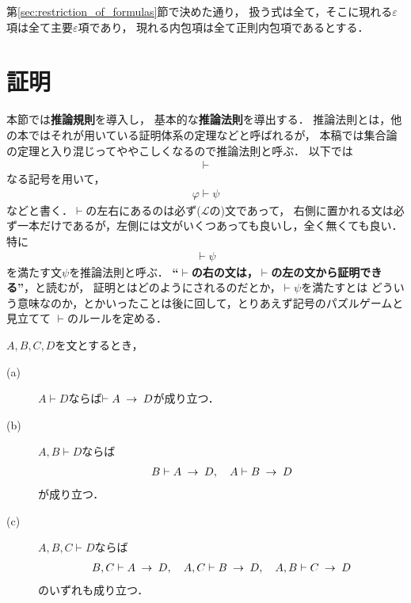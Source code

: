	第\ref{sec:restriction_of_formulas}節で決めた通り，
	扱う式は全て，そこに現れる$\varepsilon$項は全て主要$\varepsilon$項であり，
	現れる内包項は全て正則内包項であるとする．
	
\section{証明}
	本節では{\bf 推論規則}を導入し，
	基本的な{\bf 推論法則}を導出する．
	推論法則とは，他の本ではそれが用いている証明体系の定理などと呼ばれるが，
	本稿では集合論の定理と入り混じってややこしくなるので推論法則と呼ぶ．
	以下では
	\begin{align}
		\vdash
	\end{align}
	なる記号を用いて，
	\begin{align}
		\varphi \vdash \psi
	\end{align}
	などと書く．$\vdash$の左右にあるのは必ず($\mathcal{L}$の)文であって，
	右側に置かれる文は必ず一本だけであるが，左側には文がいくつあっても良いし，全く無くても良い．
	特に
	\begin{align}
		\vdash \psi
	\end{align}
	を満たす文$\psi$を推論法則と呼ぶ．
	{\bf ``$\vdash$の右の文は，$\vdash$の左の文から証明できる''}，と読むが，
	証明とはどのようにされるのだとか，$\vdash \psi$を満たすとは
	どういう意味なのか，とかいったことは後に回して，とりあえず記号のパズルゲームと見立てて
	$\vdash$のルールを定める．
	
	\begin{screen}
		\begin{logicalrule}[演繹規則]\label{logicalrule:deduction_rule}
			$A,B,C,D$を文とするとき，
			\begin{description}
				\item[(a)] $A \vdash D$ならば$\vdash A \hspace{0.25em}\rightarrow\hspace{0.25em} D$が成り立つ．
				\item[(b)] $A,B \vdash D$ならば
					\begin{align}
						B \vdash A \hspace{0.25em}\rightarrow\hspace{0.25em} D,\quad
						A \vdash B \hspace{0.25em}\rightarrow\hspace{0.25em} D
					\end{align}
					が成り立つ．
				\item[(c)] $A,B,C \vdash D$ならば
					\begin{align}
						B,C \vdash A \hspace{0.25em}\rightarrow\hspace{0.25em} D,\quad
						A,C \vdash B \hspace{0.25em}\rightarrow\hspace{0.25em} D,\quad
						A,B \vdash C \hspace{0.25em}\rightarrow\hspace{0.25em} D
					\end{align}
					のいずれも成り立つ．
			\end{description}
		\end{logicalrule}
	\end{screen}
	
